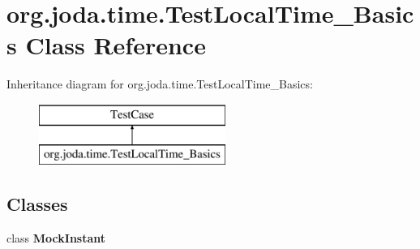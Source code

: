 \hypertarget{classorg_1_1joda_1_1time_1_1_test_local_time___basics}{\section{org.\-joda.\-time.\-Test\-Local\-Time\-\_\-\-Basics Class Reference}
\label{classorg_1_1joda_1_1time_1_1_test_local_time___basics}
}
Inheritance diagram for org.\-joda.\-time.\-Test\-Local\-Time\-\_\-\-Basics\-:\begin{figure}[H]
\begin{center}
\leavevmode
\includegraphics[height=2.000000cm]{classorg_1_1joda_1_1time_1_1_test_local_time___basics}
\end{center}
\end{figure}
\subsection*{Classes}
\begin{DoxyCompactItemize}
\item 
class {\bfseries Mock\-Instant}
\end{DoxyCompactItemize}
